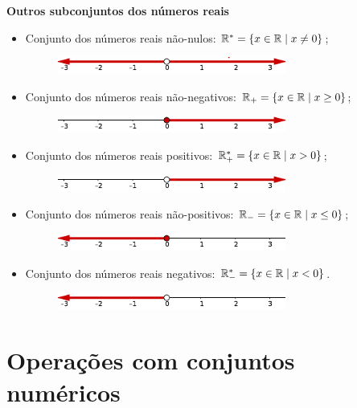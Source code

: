 \textbf{Outros subconjuntos dos números reais}
\begin{itemize}
 \item Conjunto dos números reais não-nulos: $\mathbb{R}^{*}=\{x \in \mathbb{R} \mid x \neq 0\}$;
 \begin{figure}[H]
 \centering
 \includegraphics[width=7.5cm]{./cap_conjnum/figs/n-nulos}
 \end{figure}
 \item Conjunto dos números reais não-negativos: $\mathbb{R}_{+}=\{x \in \mathbb{R} \mid x \geq 0\}$;
 \begin{figure}[H]
 \centering
 \includegraphics[width=7.5cm]{./cap_conjnum/figs/n-negativos}
 \end{figure}
 \item Conjunto dos números reais positivos: $\mathbb{R}^{*}_{+}=\{x \in \mathbb{R} \mid x > 0\}$;
 \begin{figure}[H]
 \centering
 \includegraphics[width=7.5cm]{./cap_conjnum/figs/positivos}
 \end{figure}
 \item Conjunto dos números reais não-positivos: $\mathbb{R}_{-}=\{x \in \mathbb{R} \mid x \leq 0\}$;
 \begin{figure}[H]
 \centering
 \includegraphics[width=7.5cm]{./cap_conjnum/figs/n-positivos}
 \end{figure}
 \item Conjunto dos números reais negativos: $\mathbb{R}^{*}_{-}=\{x \in \mathbb{R} \mid x < 0\}$.
 \begin{figure}[H]
 \centering
 \includegraphics[width=7.5cm]{./cap_conjnum/figs/negativos}
 \end{figure}
\end{itemize}

\section{Operações com conjuntos numéricos}

